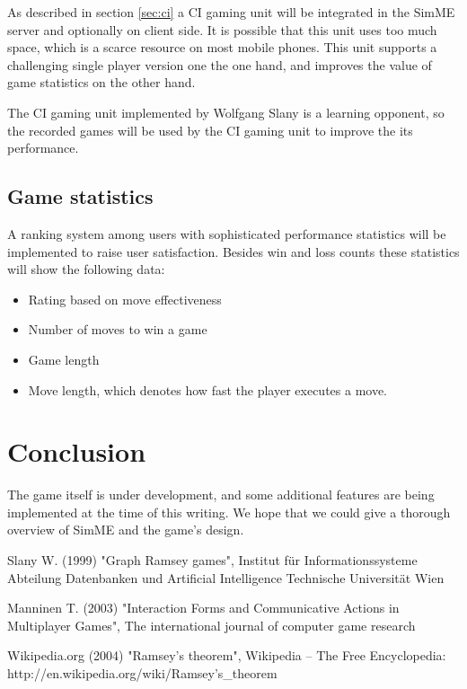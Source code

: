 		As described in section \ref{sec:ci} a CI gaming unit will be integrated
		in the SimME server and optionally on client side. It is possible that
		this unit uses too much space, which is a scarce resource on most mobile
		phones. This unit supports a challenging single player version one the
		one hand, and improves the value of game statistics on the other hand.

		The CI gaming unit implemented by Wolfgang Slany is a learning opponent,
		so the recorded games will be used by the CI gaming unit to improve the
		its performance.

	\subsection{Game statistics}

		A ranking system among users with sophisticated performance statistics
		will be implemented to raise user satisfaction. Besides win and loss
		counts these statistics will show the following data:

		\begin{itemize}

			\item Rating based on move effectiveness

			\item Number of moves to win a game

			\item Game length

			\item Move length, which denotes how fast the player executes a move.

		\end{itemize}


\section{Conclusion}

	The game itself is under development, and some additional features are being
	implemented at the time of this writing. We hope that we could give a
	thorough overview of SimME and the game's design.



\begin{thebibliography}{10}

	 Slany W. (1999) "Graph Ramsey games",
	Institut f\"ur Informationssysteme Abteilung Datenbanken und Artificial
	Intelligence Technische Universit\"at Wien

	 Manninen T. (2003) "Interaction Forms and
	Communicative Actions in Multiplayer Games", The international journal of
	computer game research

	 Wikipedia.org (2004) "Ramsey's theorem", Wikipedia --
	The Free Encyclopedia: http://en.wikipedia.org/wiki/Ramsey's\_theorem

\end{thebibliography}


